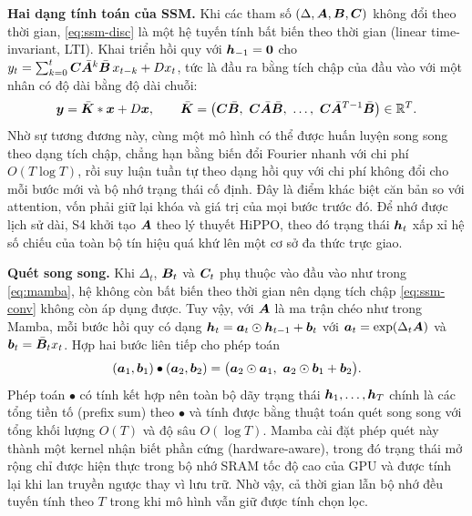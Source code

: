 \textbf{Hai dạng tính toán của SSM.} Khi các tham số $(\Delta, \bm{A}, \bm{B}, \bm{C})$ không đổi theo thời gian, \cref{eq:ssm-disc} là một hệ tuyến tính bất biến theo thời gian (linear time-invariant, LTI). Khai triển hồi quy với $\bm{h}_{-1} = \bm{0}$ cho $y_t = \sum_{k=0}^{t} \bm{C}\bar{\bm{A}}^{k}\bar{\bm{B}}\,x_{t-k} + Dx_t$, tức là đầu ra bằng tích chập của đầu vào với một nhân có độ dài bằng độ dài chuỗi:
\begin{equation}
\mat{y} = \bar{\mat{K}} * \mat{x} + D\mat{x}, \qquad
\bar{\mat{K}} = \big(\mat{C}\bar{\mat{B}},\ \mat{C}\bar{\mat{A}}\bar{\mat{B}},\ \dots,\ \mat{C}\bar{\mat{A}}^{T-1}\bar{\mat{B}}\big) \in \R^{T}.
\label{eq:ssm-conv}
\end{equation}
Nhờ sự tương đương này, cùng một mô hình có thể được huấn luyện song song theo dạng tích chập, chẳng hạn bằng biến đổi Fourier nhanh với chi phí $O(T \log T)$, rồi suy luận tuần tự theo dạng hồi quy với chi phí không đổi cho mỗi bước mới và bộ nhớ trạng thái cố định. Đây là điểm khác biệt căn bản so với attention, vốn phải giữ lại khóa và giá trị của mọi bước trước đó. Để nhớ được lịch sử dài, S4 \cite{gu2022s4} khởi tạo $\bm{A}$ theo lý thuyết HiPPO, theo đó trạng thái $\bm{h}_t$ xấp xỉ hệ số chiếu của toàn bộ tín hiệu quá khứ lên một cơ sở đa thức trực giao.

\textbf{Quét song song.} Khi $\Delta_t$, $\bm{B}_t$ và $\bm{C}_t$ phụ thuộc vào đầu vào như trong \cref{eq:mamba}, hệ không còn bất biến theo thời gian nên dạng tích chập \cref{eq:ssm-conv} không còn áp dụng được. Tuy vậy, với $\bm{A}$ là ma trận chéo như trong Mamba, mỗi bước hồi quy có dạng $\bm{h}_t = \bm{a}_t \odot \bm{h}_{t-1} + \bm{b}_t$ với $\bm{a}_t = \exp(\Delta_t \bm{A})$ và $\bm{b}_t = \bar{\bm{B}}_t x_t$. Hợp hai bước liên tiếp cho phép toán
\begin{equation}
(\bm{a}_1, \bm{b}_1) \bullet (\bm{a}_2, \bm{b}_2) = \big(\bm{a}_2 \odot \bm{a}_1,\ \bm{a}_2 \odot \bm{b}_1 + \bm{b}_2\big).
\label{eq:scan-op}
\end{equation}
Phép toán $\bullet$ có tính kết hợp nên toàn bộ dãy trạng thái $\bm{h}_1, \dots, \bm{h}_T$ chính là các tổng tiền tố (prefix sum) theo $\bullet$ và tính được bằng thuật toán quét song song \cite{blelloch1990prefix} với tổng khối lượng $O(T)$ và độ sâu $O(\log T)$. Mamba \cite{gu2023mamba} cài đặt phép quét này thành một kernel nhận biết phần cứng (hardware-aware), trong đó trạng thái mở rộng chỉ được hiện thực trong bộ nhớ SRAM tốc độ cao của GPU và được tính lại khi lan truyền ngược thay vì lưu trữ. Nhờ vậy, cả thời gian lẫn bộ nhớ đều tuyến tính theo $T$ trong khi mô hình vẫn giữ được tính chọn lọc.

